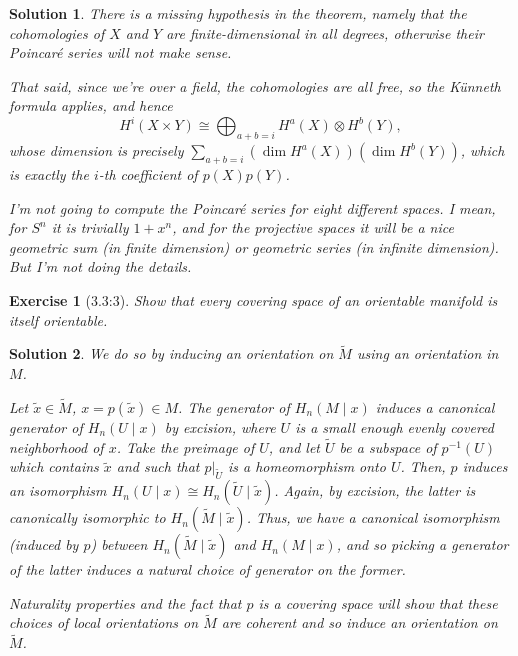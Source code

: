 \documentclass{article}
\theoremstyle{plain}
\newtheorem*{ex}{Exercise}
\theoremstyle{nonumberplain}
\newtheorem{sol}{Solution}
\begin{document}
\begin{sol}
There is a missing hypothesis in the theorem, namely that the cohomologies of $X$ and $Y$ are finite-dimensional in all degrees, otherwise their Poincaré series will not make sense.

That said, since we're over a field, the cohomologies are all free, so the Künneth formula applies, and hence
\begin{equation}
H^i(X \times Y) \cong \bigoplus_{a+b=i} H^a(X) \otimes H^b(Y),
\end{equation}
whose dimension is precisely $\sum_{a+b=i} (\dim H^a(X))(\dim H^b(Y))$, which is exactly the $i$-th coefficient of $p(X) p(Y)$.

\medskip

I'm not going to compute the Poincaré series for eight different spaces. I mean, for $S^n$ it is trivially $1+x^n$, and for the projective spaces it will be a nice geometric sum (in finite dimension) or geometric series (in infinite dimension). But I'm not doing the details.
\end{sol}

\begin{ex}[3.3:3]
Show that every covering space of an orientable manifold is itself orientable.
\end{ex}

\begin{sol}
We do so by inducing an orientation on $\tilde M$ using an orientation in $M$.

Let $\tilde x \in \tilde M$, $x = p(\tilde x) \in M$. The generator of $H_n(M \mid x)$ induces a canonical generator of $H_n(U \mid x)$ by excision, where $U$ is a small enough evenly covered neighborhood of $x$. Take the preimage of $U$, and let $\tilde U$ be a subspace of $p^{-1}(U)$ which contains $\tilde x$ and such that $p|_{\tilde U}$ is a homeomorphism onto $U$. Then, $p$ induces an isomorphism $H_n(U \mid x) \cong H_n(\tilde U \mid \tilde x)$. Again, by excision, the latter is canonically isomorphic to $H_n(\tilde M \mid \tilde x)$. Thus, we have a canonical isomorphism (induced by $p$) between $H_n(\tilde M \mid \tilde x)$ and $H_n(M \mid x)$, and so picking a generator of the latter induces a natural choice of generator on the former.

Naturality properties and the fact that $p$ is a covering space will show that these choices of local orientations on $\tilde M$ are coherent and so induce an orientation on $\tilde M$.
\end{sol}
\end{document}
